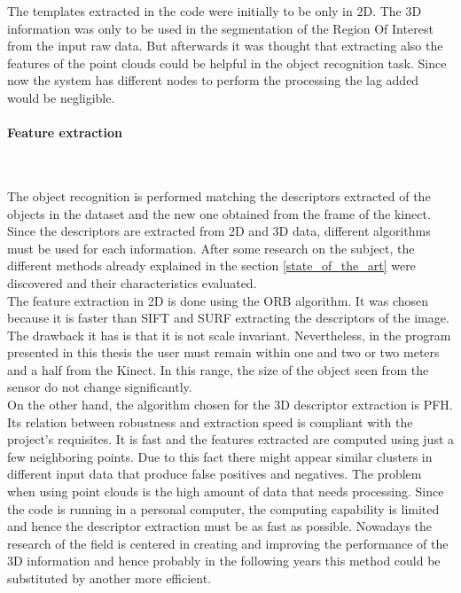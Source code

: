 The templates extracted in the code were initially to be only in 2D. The 3D information was only to be used in the segmentation of the Region Of Interest from the input raw data. But afterwards it was thought that extracting also the features of the point clouds could be helpful in the object recognition task. Since now the system has different nodes to perform the processing the lag added would be negligible. 
\\

\paragraph{Feature extraction}
\mbox{} \\
	\label{feature_extraction}

The object recognition is performed matching the descriptors extracted of the objects in the dataset and the new one obtained from the frame of the kinect. Since the descriptors are extracted from 2D and 3D data, different algorithms must be used for each information. After some research on the subject, the different methods already explained in the section \ref{state_of_the_art} were discovered and their characteristics evaluated. 
\\

The feature extraction in 2D is done using the ORB algorithm. It was chosen because it is faster than SIFT and SURF extracting the descriptors of the image. The drawback it has is that it is not scale invariant. Nevertheless, in the program presented in this thesis the user must remain within one and two or two meters and a half from the Kinect. In this range, the size of the object seen from the sensor do not change significantly. 
\\

On the other hand, the algorithm chosen for the 3D descriptor extraction is PFH. Its relation between robustness and extraction speed is compliant with the project's requisites. It is fast and the features extracted are computed using just a few neighboring points. Due to this fact there might appear similar clusters in different input data that produce false positives and negatives. The problem when using point clouds is the high amount of data that needs processing. Since the code is running in a personal computer, the computing capability is limited and hence the descriptor extraction must be as fast as possible. Nowadays the research of the field is centered in creating and improving the performance of the 3D information and hence probably in the following years this method could be substituted by another more efficient.  
